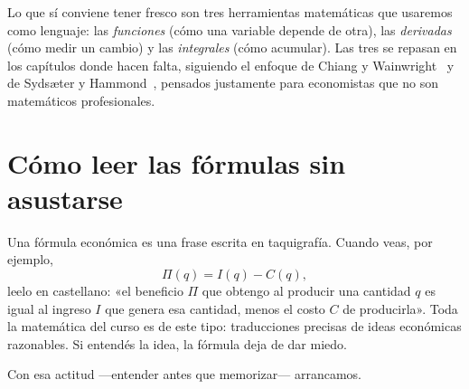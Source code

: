 Lo que sí conviene tener fresco son tres herramientas matemáticas que usaremos como lenguaje: las \emph{funciones} (cómo una variable depende de otra), las \emph{derivadas} (cómo medir un cambio) y las \emph{integrales} (cómo acumular). Las tres se repasan en los capítulos donde hacen falta, siguiendo el enfoque de Chiang y Wainwright~\cite{chiang} y de Sydsæter y Hammond~\cite{sydsaeter}, pensados justamente para economistas que no son matemáticos profesionales.

\section{Cómo leer las fórmulas sin asustarse}

Una fórmula económica es una frase escrita en taquigrafía. Cuando veas, por ejemplo,
\[
\Pi(q) = I(q) - C(q),
\]
leelo en castellano: «el beneficio $\Pi$ que obtengo al producir una cantidad $q$ es igual al ingreso $I$ que genera esa cantidad, menos el costo $C$ de producirla». Toda la matemática del curso es de este tipo: traducciones precisas de ideas económicas razonables. Si entendés la idea, la fórmula deja de dar miedo.

Con esa actitud —entender antes que memorizar— arrancamos.
